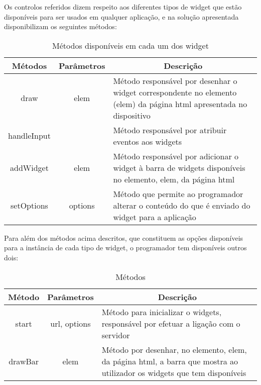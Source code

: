 	Os controlos referidos dizem respeito aos diferentes tipos de widget que estão disponíveis para ser usados em qualquer aplicação, e na solução apresentada disponibilizam os seguintes métodos:
	
 	\begin{table}[ht]
 	\renewcommand{\arraystretch}{1.5}
	\centering

	\begin{tabular}{ p{2cm}|p{2cm}|p{10cm}  }
	\multicolumn{1}{c}{\textbf{Métodos}} & \multicolumn{1}{c}{\textbf{Parâmetros}} & \multicolumn{1}{c}{\textbf{Descrição}} \\
	\hline
	\multicolumn{1}{c}{draw} & \multicolumn{1}{c}{elem} &Método responsável por desenhar o widget correspondente no elemento (elem) da página html apresentada no dispositivo \\
	\hline
	\multicolumn{1}{c}{handleInput} & \multicolumn{1}{c}{} &Método responsável por atribuir eventos aos widgets \\
	\hline
	\multicolumn{1}{c}{addWidget} & \multicolumn{1}{c}{elem} &Método responsável por adicionar o widget à barra de widgets disponíveis no elemento, elem, da página html \\
	\hline
	\multicolumn{1}{c}{setOptions} & \multicolumn{1}{c}{options} &Método que permite ao programador alterar o conteúdo do que é enviado do widget para a aplicação  \\
	\hline
	\end{tabular}
	\caption{Métodos disponíveis em cada um dos widget}
	\label{table:metodos}
	\end{table}


Para além dos métodos acima descritos, que constituem as opções disponíveis para a instância de cada tipo de widget, o programador tem disponíveis outros dois:

	\begin{table}[ht]
 	\renewcommand{\arraystretch}{1.5}
	\centering

	\begin{tabular}{ p{2cm}|p{2cm}|p{10cm}  }
	\multicolumn{1}{c}{\textbf{Método}} & \multicolumn{1}{c}{\textbf{Parâmetros}} & \multicolumn{1}{c}{\textbf{Descrição}} \\
	\hline
	\multicolumn{1}{c}{start} & \multicolumn{1}{c}{url, options} &Método para inicializar o widgets, responsável por efetuar a ligação com o servidor \\
	\hline
	\multicolumn{1}{c}{drawBar} & \multicolumn{1}{c}{elem} &Método por desenhar, no elemento, elem, da página html, a barra que mostra ao utilizador os widgets que tem disponíveis \\
	\hline
	\end{tabular}
	\caption{Métodos}
	\label{table:metodos_g}
	\end{table}



